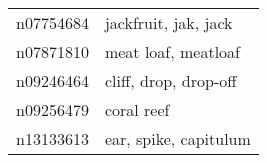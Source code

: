 \begin{appendices}
\begin{longtabu}{X|X[4]}
    		n07754684 &                                                                                                       jackfruit, jak, jack \tabularnewline
    		n07871810 &                                                                                                        meat loaf, meatloaf \tabularnewline
    		n09246464 &                                                                                                      cliff, drop, drop-off \tabularnewline
    		n09256479 &                                                                                                                 coral reef \tabularnewline
    		n13133613 &                                                                                                      ear, spike, capitulum \tabularnewline
    		\bottomrule
    	\end{longtabu}
    	
    \end{appendices}
    
    
    